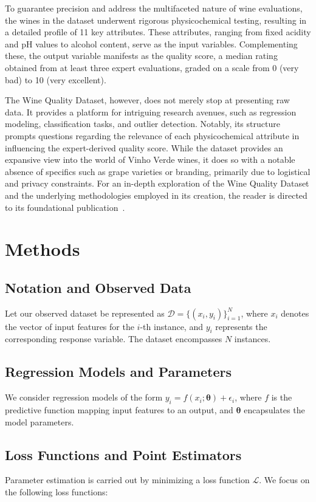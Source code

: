 \documentclass[12pt]{article}
\begin{document}
To guarantee precision and address the multifaceted nature of wine evaluations, the wines in the dataset underwent rigorous physicochemical testing, resulting in a detailed profile of 11 key attributes. These attributes, ranging from fixed acidity and pH values to alcohol content, serve as the input variables. Complementing these, the output variable manifests as the quality score, a median rating obtained from at least three expert evaluations, graded on a scale from 0 (very bad) to 10 (very excellent).

The Wine Quality Dataset, however, does not merely stop at presenting raw data. It provides a platform for intriguing research avenues, such as regression modeling, classification tasks, and outlier detection. Notably, its structure prompts questions regarding the relevance of each physicochemical attribute in influencing the expert-derived quality score. While the dataset provides an expansive view into the world of Vinho Verde wines, it does so with a notable absence of specifics such as grape varieties or branding, primarily due to logistical and privacy constraints. For an in-depth exploration of the Wine Quality Dataset and the underlying methodologies employed in its creation, the reader is directed to its foundational publication~\citep{wine_quality_source}.

\section{Methods}

\subsection{Notation and Observed Data}
Let our observed dataset be represented as \( \mathcal{D} = \{ (x_i, y_i) \}_{i=1}^{N} \), where \( x_i \) denotes the vector of input features for the \( i \)-th instance, and \( y_i \) represents the corresponding response variable. The dataset encompasses \( N \) instances.

\subsection{Regression Models and Parameters}
We consider regression models of the form \( y_i = f(x_i; \boldsymbol{\theta}) + \epsilon_i \), where \( f \) is the predictive function mapping input features to an output, and \( \boldsymbol{\theta} \) encapsulates the model parameters.

\subsection{Loss Functions and Point Estimators}
Parameter estimation is carried out by minimizing a loss function \( \mathcal{L} \). We focus on the following loss functions:
\end{document}
